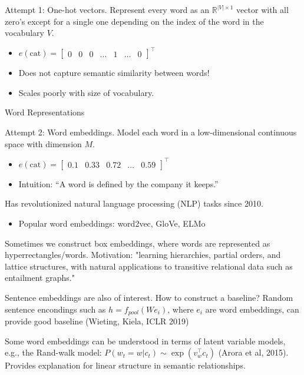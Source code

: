 \documentclass[english]{article}
\begin{document}
Attempt 1: One-hot vectors. Represent every word as an $\mathbb{R}^{|V|\times 1}$ vector with all zero's except for a single one depending on the index of the word in the vocabulary $V$.
\begin{itemize}
\item $e(\text{cat})=\left[\begin{smallmatrix}
0 & 0 & 0 & \dots & 1 & \dots & 0
\end{smallmatrix}\right]^\top$
\item Does not capture semantic similarity between words!
\item Scales poorly with size of vocabulary.
\end{itemize}
 

\item 
 {Word Representations}

Attempt 2: Word embeddings. Model each word in a low-dimensional continuous space with dimension $M$.
\begin{itemize}
\item $e(\text{cat})=\left[\begin{smallmatrix}
0.1 & 0.33 & 0.72 & \dots & 0.59
\end{smallmatrix}\right]^\top$
\item Intuition: ``A word is defined by the company it keeps.''
\end{itemize}
\vspace{5mm}
Has revolutionized natural language processing (NLP) tasks since 2010.
\begin{itemize}
\item Popular word embeddings: word2vec, GloVe, ELMo
\end{itemize}
 
Sometimes we construct box embeddings, where words are represented as hyperrectangles/words. Motivation: "learning hierarchies, partial orders, and lattice structures, with natural applications to transitive relational data such as entailment graphs." 

Sentence embeddings are also of interest. How to construct a baseline? Random sentence encondings such as $h=f_{pool}(We_i)$, where $e_i$ are word embeddings, can provide good baseline (Wieting, Kiela, ICLR 2019)


Some word embeddings can be understood in terms of latent variable models, e.g., the Rand-walk model: $P(w_t=w|c_t)\sim \exp(v_w^\top c_t)$ (Arora et al, 2015). Provides explanation for linear structure in semantic relationships. 
\end{document}
